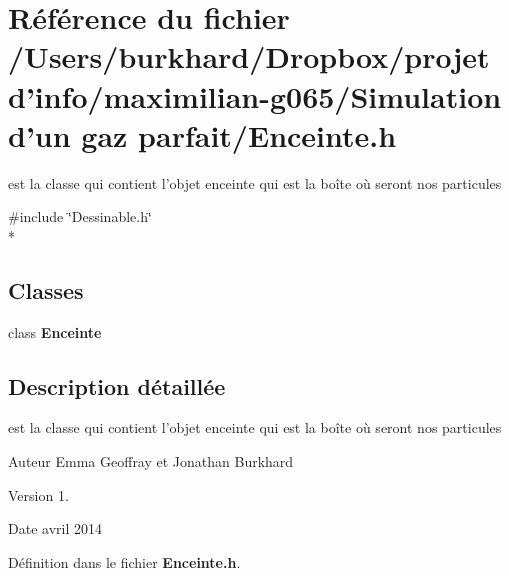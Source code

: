 \section{Référence du fichier /\+Users/burkhard/\+Dropbox/projet d'info/maximilian-\/g065/\+Simulation d'un gaz parfait/\+Enceinte.h}
\label{_enceinte_8h}


est la classe qui contient l'objet enceinte qui est la boîte où seront nos particules  


{\ttfamily \#include \char`\"{}Dessinable.\+h\char`\"{}}\\*
\subsection*{Classes}
\begin{DoxyCompactItemize}
\item 
class {\bf Enceinte}
\end{DoxyCompactItemize}


\subsection{Description détaillée}
est la classe qui contient l'objet enceinte qui est la boîte où seront nos particules 

\begin{DoxyAuthor}{Auteur}
Emma Geoffray et Jonathan Burkhard 
\end{DoxyAuthor}
\begin{DoxyVersion}{Version}
1. 
\end{DoxyVersion}
\begin{DoxyDate}{Date}
avril 2014 
\end{DoxyDate}


Définition dans le fichier {\bf Enceinte.\+h}.


